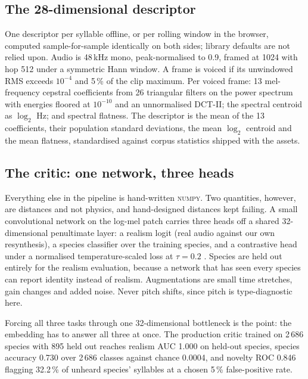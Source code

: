 \documentclass[10pt,twocolumn,a4paper]{article}
\begin{document}
\subsection{The 28-dimensional descriptor}

One descriptor per syllable offline, or per rolling window in the browser, computed
sample-for-sample identically on both sides; library defaults are not relied upon. Audio is
48\,kHz mono, peak-normalised to 0.9, framed at 1024 with hop 512 under a symmetric Hann
window. A frame is voiced if its unwindowed RMS exceeds $10^{-4}$ and 5\,\% of the clip
maximum. Per voiced frame: 13 mel-frequency cepstral coefficients from 26 triangular
filters on the power spectrum with energies floored at $10^{-10}$ and an unnormalised
DCT-II; the spectral centroid as $\log_2$ Hz; and spectral flatness. The descriptor is the
mean of the 13 coefficients, their population standard deviations, the mean $\log_2$
centroid and the mean flatness, standardised against corpus statistics shipped with the
assets.

\subsection{The critic: one network, three heads}

Everything else in the pipeline is hand-written \textsc{numpy}. Two quantities, however, are
distances and not physics, and hand-designed distances kept failing. A small
convolutional network on the log-mel patch carries three heads off a shared 32-dimensional
penultimate layer: a realism logit (real audio against our own resynthesis), a species
classifier over the training species, and a contrastive head under a
normalised temperature-scaled loss at $\tau = 0.2$ \citep{simclr2020}. Species are held
out entirely for the realism evaluation, because a network that has seen every species can
report identity instead of realism. Augmentations are small time stretches, gain changes
and added noise. Never pitch shifts, since pitch is type-diagnostic here.

Forcing all three tasks through one 32-dimensional bottleneck is the point: the embedding
has to answer all three at once. The production critic trained on 2\,686 species with 895
held out reaches realism AUC 1.000 on held-out species, species accuracy 0.730 over 2\,686
classes against chance 0.0004, and novelty ROC 0.846 flagging 32.2\,\% of unheard species'
syllables at a chosen 5\,\% false-positive rate.
\end{document}
